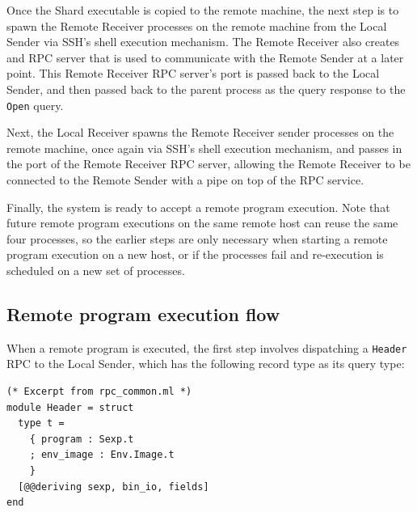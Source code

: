 \documentclass[twoside]{report}
\newcommand{\todoi}[1]{\todo[inline, color=blue!20]{TODO: {#1}}}
\begin{document}
Once the Shard executable is copied to the remote machine, the next step is to spawn the Remote Receiver processes on the remote machine from the Local Sender via SSH's shell execution mechanism.
The Remote Receiver also creates and RPC server that is used to communicate with the Remote Sender at a later point.
This Remote Receiver RPC server's port is passed back to the Local Sender, and then passed back to the parent process as the query response to the \texttt{Open} query.

Next, the Local Receiver spawns the Remote Receiver sender processes on the remote machine, once again via SSH's shell execution mechanism, and passes in the port of the Remote Receiver RPC server, allowing the Remote Receiver to be connected to the Remote Sender with a pipe on top of the RPC service.

Finally, the system is ready to accept a remote program execution.
Note that future remote program executions on the same remote host can reuse the same four processes, so the earlier steps are only necessary when starting a remote program execution on a new host, or if the processes fail and re-execution is scheduled on a new set of processes.

\subsection{Remote program execution flow}

When a remote program is executed, the first step involves dispatching a \texttt{Header} RPC to the Local Sender, which has the following record type as its query type:

\begin{minipage}[c]{\textwidth-15pt}
  \begin{lstlisting}
(* Excerpt from rpc_common.ml *)
module Header = struct
  type t =
    { program : Sexp.t
    ; env_image : Env.Image.t
    }
  [@@deriving sexp, bin_io, fields]
end
\end{lstlisting}
  \smallskip
\end{minipage}

\end{document}
